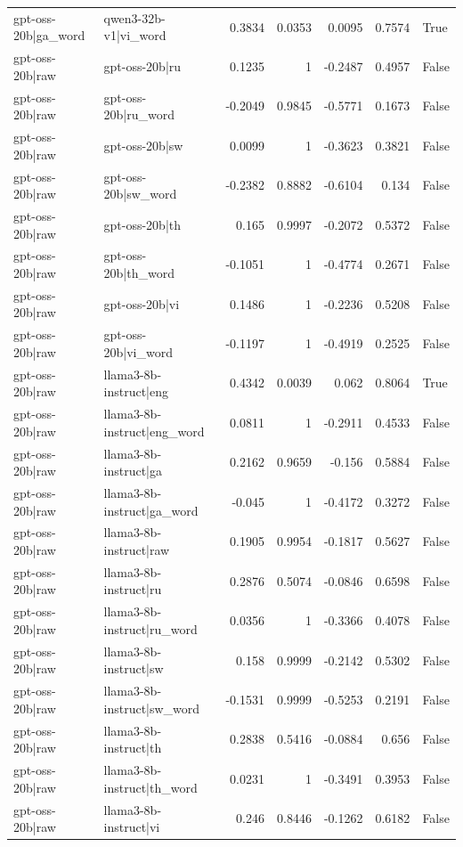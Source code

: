 \begin{table}
\begin{tabular}{l l r r r r l}
gpt-oss-20b|ga_word & qwen3-32b-v1|vi_word & 0.3834 & 0.0353 & 0.0095 & 0.7574 & True \\
gpt-oss-20b|raw & gpt-oss-20b|ru & 0.1235 & 1 & -0.2487 & 0.4957 & False \\
gpt-oss-20b|raw & gpt-oss-20b|ru_word & -0.2049 & 0.9845 & -0.5771 & 0.1673 & False \\
gpt-oss-20b|raw & gpt-oss-20b|sw & 0.0099 & 1 & -0.3623 & 0.3821 & False \\
gpt-oss-20b|raw & gpt-oss-20b|sw_word & -0.2382 & 0.8882 & -0.6104 & 0.134 & False \\
gpt-oss-20b|raw & gpt-oss-20b|th & 0.165 & 0.9997 & -0.2072 & 0.5372 & False \\
gpt-oss-20b|raw & gpt-oss-20b|th_word & -0.1051 & 1 & -0.4774 & 0.2671 & False \\
gpt-oss-20b|raw & gpt-oss-20b|vi & 0.1486 & 1 & -0.2236 & 0.5208 & False \\
gpt-oss-20b|raw & gpt-oss-20b|vi_word & -0.1197 & 1 & -0.4919 & 0.2525 & False \\
gpt-oss-20b|raw & llama3-8b-instruct|eng & 0.4342 & 0.0039 & 0.062 & 0.8064 & True \\
gpt-oss-20b|raw & llama3-8b-instruct|eng_word & 0.0811 & 1 & -0.2911 & 0.4533 & False \\
gpt-oss-20b|raw & llama3-8b-instruct|ga & 0.2162 & 0.9659 & -0.156 & 0.5884 & False \\
gpt-oss-20b|raw & llama3-8b-instruct|ga_word & -0.045 & 1 & -0.4172 & 0.3272 & False \\
gpt-oss-20b|raw & llama3-8b-instruct|raw & 0.1905 & 0.9954 & -0.1817 & 0.5627 & False \\
gpt-oss-20b|raw & llama3-8b-instruct|ru & 0.2876 & 0.5074 & -0.0846 & 0.6598 & False \\
gpt-oss-20b|raw & llama3-8b-instruct|ru_word & 0.0356 & 1 & -0.3366 & 0.4078 & False \\
gpt-oss-20b|raw & llama3-8b-instruct|sw & 0.158 & 0.9999 & -0.2142 & 0.5302 & False \\
gpt-oss-20b|raw & llama3-8b-instruct|sw_word & -0.1531 & 0.9999 & -0.5253 & 0.2191 & False \\
gpt-oss-20b|raw & llama3-8b-instruct|th & 0.2838 & 0.5416 & -0.0884 & 0.656 & False \\
gpt-oss-20b|raw & llama3-8b-instruct|th_word & 0.0231 & 1 & -0.3491 & 0.3953 & False \\
gpt-oss-20b|raw & llama3-8b-instruct|vi & 0.246 & 0.8446 & -0.1262 & 0.6182 & False \\

\end{tabular}
\end{table}
